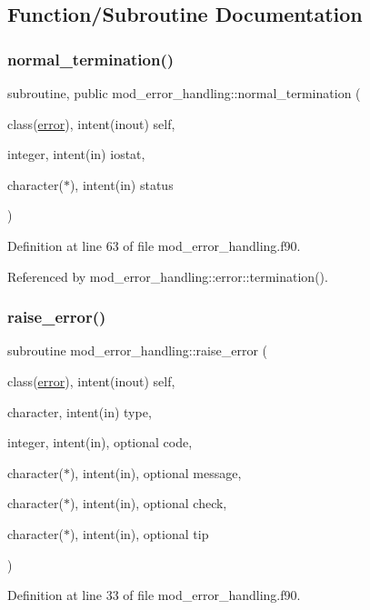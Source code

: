 \subsection{Function/\+Subroutine Documentation}
\mbox{\label{namespacemod__error__handling_a54366620ef058729af93f4bc7d507df7}} 
\subsubsection{\texorpdfstring{normal\+\_\+termination()}{normal\_termination()}}
{\footnotesize\ttfamily subroutine, public mod\+\_\+error\+\_\+handling\+::normal\+\_\+termination (\begin{DoxyParamCaption}\item[{class(\hyperlink{structmod__error__handling_1_1error}{error}), intent(inout)}]{self,  }\item[{integer, intent(in)}]{iostat,  }\item[{character($\ast$), intent(in)}]{status }\end{DoxyParamCaption})}



Definition at line 63 of file mod\+\_\+error\+\_\+handling.\+f90.



Referenced by mod\+\_\+error\+\_\+handling\+::error\+::termination().

\mbox{\label{namespacemod__error__handling_a93bd5f43a4db84dd187231ce58493d0a}} 
\subsubsection{\texorpdfstring{raise\+\_\+error()}{raise\_error()}}
{\footnotesize\ttfamily subroutine mod\+\_\+error\+\_\+handling\+::raise\+\_\+error (\begin{DoxyParamCaption}\item[{class(\hyperlink{structmod__error__handling_1_1error}{error}), intent(inout)}]{self,  }\item[{character, intent(in)}]{type,  }\item[{integer, intent(in), optional}]{code,  }\item[{character($\ast$), intent(in), optional}]{message,  }\item[{character($\ast$), intent(in), optional}]{check,  }\item[{character($\ast$), intent(in), optional}]{tip }\end{DoxyParamCaption})}



Definition at line 33 of file mod\+\_\+error\+\_\+handling.\+f90.

